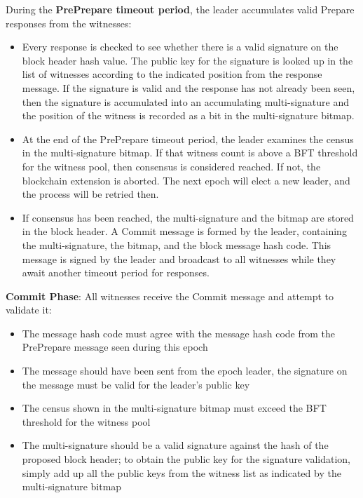 \documentclass[a4paper, 10pt, conference]{ieeeconf}
\begin{document}
\begin{itemize}
{	\item{During the \textbf{PrePrepare timeout period}, the leader accumulates valid Prepare responses from the witnesses:

		\begin{itemize}
			\item {Every response is checked to see whether there is a valid signature on the block header hash value. The public key for the signature is looked up in the list of witnesses according to the indicated position from the response message. If the signature is valid and the response has not already been seen, then the signature is accumulated into an accumulating multi-signature and the position of the witness is recorded as a bit in the multi-signature bitmap.} 

			\item {At the end of the PrePrepare timeout period, the leader examines the census in the multi-signature bitmap. If that witness count is above a BFT threshold for the witness pool, then consensus is considered reached. If not, the blockchain extension is aborted. The next epoch will elect a new leader, and the process will be retried then.}

			\item {If consensus has been reached, the multi-signature and the bitmap are stored in the block header. A Commit message is formed by the leader, containing the multi-signature, the bitmap, and the block message hash code. This message is signed by the leader and broadcast to all witnesses while they await another timeout period for responses.}
		\end{itemize}}

	\item {\textbf{Commit Phase}: All witnesses receive the Commit message and attempt to validate it:

		\begin{itemize}
			\item {The message hash code must agree with the message hash code from the PrePrepare message seen during this epoch}
		\item{The message should have been sent from the epoch leader, the signature on the message must be valid for the leader's public key}
			\item{The census shown in the multi-signature bitmap must exceed the BFT threshold for the witness pool}
			\item{The multi-signature should be a valid signature against the hash of the proposed block header; to obtain the public key for the signature validation, simply add up all the public keys from the witness list as indicated by the multi-signature bitmap}
		\end{itemize}

}}
\end{itemize}
\end{document}
